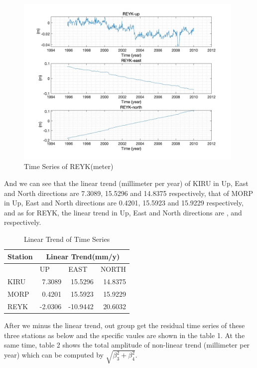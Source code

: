 \documentclass{article}
\begin{document}
\begin{figure}[htbp]
  \centering
  \includegraphics[width=11cm]{../result/re_figure/fig_REYK/figure1.jpg}
  \caption{Time Series of REYK(meter)}
  \label{fig:Ori_REYK}
\end{figure}

And we can see that the linear trend (millimeter per year) of KIRU in Up, East and North directions are 7.3089, 15.5296 and 14.8375 respectively, 
 that of MORP in Up, East and North directions are 0.4201, 15.5923 and 15.9229 respectively,
 and as for REYK, the linear trend in Up, East and North directions are ,  and  respectively.
 \vspace{5pt}
\begin{table}[H]
  \centering
  \caption{Linear Trend of Time Series}
    \begin{tabular}{lrrr}
    \large Station & \multicolumn{3}{c}{\large Linear Trend(mm/y)} \\
    \midrule
          &\multicolumn{1}{l}{\large UP} & \multicolumn{1}{l}{\large EAST} & \multicolumn{1}{l}{\large NORTH} \\ [5pt]
          
     KIRU&7.3089 & 15.5296 & 14.8375\\[3pt]
     MORP&0.4201 & 15.5923 & 15.9229\\ [3pt]
     REYK&-2.0306 & -10.9442 & 20.6032\\
    \end{tabular}%
  \label{Tab:lin_trend}%
\end{table}

After we minus the linear trend, out group get the residual time series of these three stations as below 
and the specific vaules are shown in the table 1. 
At the same time, table 2 shows the total amplitude of non-linear trend (millimeter per year) which can be computed by $\sqrt{\beta_3^2+\beta_4^2}$.
\end{document}
